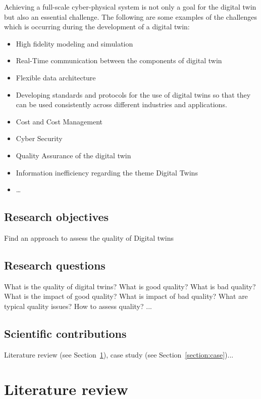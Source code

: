 \documentclass[9pt,conference]{IEEEtran}
\begin{document}
    Achieving a full-scale cyber-physical system is not only a goal for the digital twin but also an essential challenge. The following are some examples of the challenges which is occurring during the development of a digital twin:
    \begin{itemize}
        \item High fidelity modeling and simulation
        \item Real-Time communication between the components of digital twin 
        \item Flexible data architecture
        \item Developing standards and protocols for the use of digital twins so that they can be used consistently across different industries and applications.
        \item Cost and Cost Management
        \item Cyber Security
        \item Quality Assurance of the digital twin
        \item Information inefficiency regarding the theme Digital Twins
        \item \dots{}
    \end{itemize}
    
    \subsection{Research objectives}
    
    Find an approach to assess the quality of Digital twins

    \subsection{Research questions}

    What is the quality of digital twins? What is good quality? What is bad quality? What is the impact of good quality? What is impact of bad quality? What are typical quality issues? How to assess quality? ...

    \subsection{Scientific contributions}

    Literature review (see Section~\ref{section:literature}), case study (see Section~\ref{section:case})...
    
    \section{Literature review}
    \label{section:literature}
\end{document}
